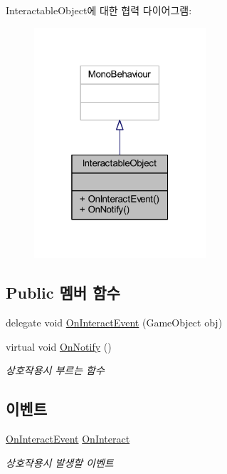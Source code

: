 Interactable\+Object에 대한 협력 다이어그램\+:
\nopagebreak
\begin{figure}[H]
\begin{center}
\leavevmode
\includegraphics[width=181pt]{de/d00/class_interactable_object__coll__graph}
\end{center}
\end{figure}
\subsection*{Public 멤버 함수}
\begin{DoxyCompactItemize}
\item 
delegate void \mbox{\hyperlink{class_interactable_object_a70a579e4b09d53e6cb77b5222189d5eb}{On\+Interact\+Event}} (Game\+Object obj)
\item 
virtual void \mbox{\hyperlink{class_interactable_object_aa5c752d17471fe0daf58a4d00c218a29}{On\+Notify}} ()
\begin{DoxyCompactList}\small\item\em 상호작용시 부르는 함수 \end{DoxyCompactList}\end{DoxyCompactItemize}
\subsection*{이벤트}
\begin{DoxyCompactItemize}
\item 
\mbox{\hyperlink{class_interactable_object_a70a579e4b09d53e6cb77b5222189d5eb}{On\+Interact\+Event}} \mbox{\hyperlink{class_interactable_object_afe5e0b16d86c2ed4abf4a71a1995f7ae}{On\+Interact}}
\begin{DoxyCompactList}\small\item\em 상호작용시 발생할 이벤트 \end{DoxyCompactList}\end{DoxyCompactItemize}


